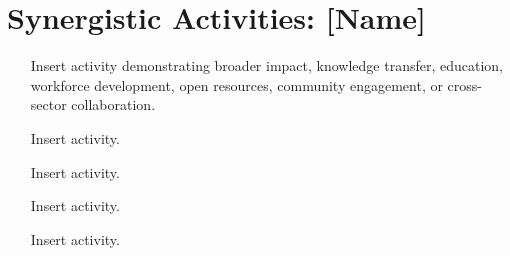 \documentclass[11pt,letterpaper]{article}
\begin{document}
\section*{Synergistic Activities: [Name]}


\begin{enumerate}
\item [Insert activity demonstrating broader impact, knowledge transfer,
education, workforce development, open resources, community engagement, or
cross-sector collaboration.]

\item [Insert activity.]

\item [Insert activity.]

\item [Insert activity.]

\item [Insert activity.]
\end{enumerate}
\end{document}

